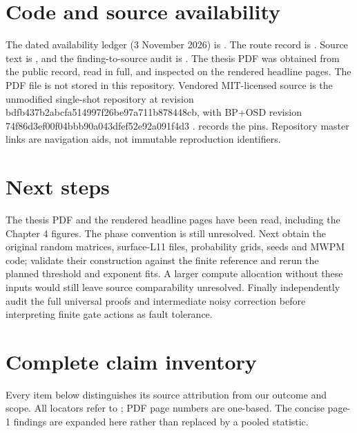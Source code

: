 \section{Code and source availability}
The dated availability ledger (3 November 2026) is \href{https://github.com/alectionary/vibe-math/blob/master/formalization/quintavalle-hgp/availability.md}{}. The route record is \href{https://github.com/alectionary/vibe-math/blob/master/formalization/quintavalle-hgp/provenance/source-acquisition.json}{}. Source text is \href{https://github.com/alectionary/vibe-math/blob/master/formalization/quintavalle-hgp/sources/browser-extraction.txt}{}, and the finding-to-source audit is \href{https://github.com/alectionary/vibe-math/blob/master/formalization/quintavalle-hgp/sources/headline-finding-audit.json}{}. The thesis PDF was obtained from the public record, read in full, and inspected on the rendered headline pages. The PDF file is not stored in this repository. Vendored MIT-licensed source is the unmodified single-shot repository at revision bdfb437b2abcfa514997f26be97a711b878448cb, with BP+OSD revision 74f86d3ef00f04bbb90a043dfef52e92a091f4d3 \citep{upstream}. \href{https://github.com/alectionary/vibe-math/blob/master/formalization/quintavalle-hgp/provenance/upstream.json}{} records the pins. Repository master links are navigation aids, not immutable reproduction identifiers.

\section{Next steps}
The thesis PDF and the rendered headline pages have been read, including the Chapter 4 figures. The phase convention is still unresolved. Next obtain the original random matrices, surface-L11 files, probability grids, seeds and MWPM code; validate their construction against the finite reference and rerun the planned threshold and exponent fits. A larger compute allocation without these inputs would still leave source comparability unresolved. Finally independently audit the full universal proofs and intermediate noisy correction before interpreting finite gate actions as fault tolerance.

\appendix
\section{Complete claim inventory}
Every item below distinguishes its source attribution from our outcome and scope. All locators refer to \citet{quintavalle2022}; PDF page numbers are one-based. The concise page-1 findings are expanded here rather than replaced by a pooled statistic.
